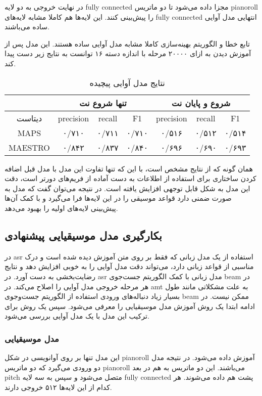 در نهایت خروجی به دو لایه \gls{fully connected} مجزا داده می‌شود تا دو ماتریس
\gls{pianoroll} را پیش‌بینی کنند. این لایه‌ها هم کاملا مشابه لایه‌های \gls{fully
connected} انتهایی مدل آوایی ساده می‌باشند.

تابع خطا و الگوریتم بهینه‌سازی کاملا مشابه مدل آوایی ساده هستند. این مدل پس از
آموزش دیدن به ازای ۲۰۰۰۰ مرحله با اندازه دسته ۱۶ توانست به نتایج زیر دست پیدا
کند.
\begin{table}[ht]
    \centering
    \begin{tabular}{|c|c|c|c|c|c|c|}
        \hline
        & \multicolumn{3}{|c|}{تنها شروع نت} & \multicolumn{3}{|c|}{شروع و پایان نت} \\
        \hline
        دیتاست & \gls{precision} & \gls{recall} & F1 & \gls{precision} & \gls{recall} & F1 \\
        \hline
        MAPS & ۰/۷۱۰ & ۰/۷۱۱ & ۰/۷۱۰ & ۰/۵۱۶ & ۰/۵۱۲ & ۰/۵۱۴ \\
        \hline
        MAESTRO & ۰/۸۴۲ & ۰/۸۳۷ & ۰/۸۴۰ & ۰/۶۹۶ & ۰/۶۹۰ & ۰/۶۹۳ \\
        \hline
    \end{tabular}
    \caption{نتایج مدل آوایی پیچیده}
\end{table}

همان گونه که از نتایج مشخص است، با این که تنها تفاوت این مدل با مدل قبل اضافه
کردن ساختاری برای استفاده از اطلاعات به دست آماده از فریم‌های دورتر است، دقت این
مدل به شکل قابل توجهی افزایش یافته است. در نتیجه می‌توان گفت که مدل به صورت ضمنی
دارد قواعد موسیقی را در این لایه‌ها فرا می‌گیرد و با کمک آن‌ها پیش‌بینی لایه‌های
اولیه را بهبود می‌دهد.

\subsection{بکارگیری مدل موسیقیایی پیشنهادی}
در \gls{asr} استفاده از یک مدل زبانی که فقط بر روی متن آموزش دیده شده است و درک
مناسبی از قواعد زبانی دارد، می‌تواند دقت مدل آوایی را به خوبی افزایش دهد و نتایج
رضایت‌بخشی به دست آورد. در \gls{asr} مدل زبانی با کمک الگوریتم جست‌جوی beam در هر
مرحله خروجی مدل آوایی را اصلاح می‌کند. در \gls{amt} به علت مشکلاتی مانند طول
بسیار زیاد دنباله‌های ورودی استفاده از الگوریتم جست‌وجوی beam ممکن نیست. در
ادامه ابتدا یک روش آموزش مدل موسیقیایی را معرفی می‌شود. سپس یک روش برای ترکیب
این مدل با یک مدل آوایی بررسی می‌شود.

\subsubsection{مدل موسیقیایی}
این مدل تنها بر روی آوانویسی در شکل \gls{pianoroll} آموزش داده می‌شود. در نتیجه
مدل دو ورودی می‌گیرد که دو ماتریس \gls{pianoroll} می‌باشند. این دو ماتریس به هم
در بعد \gls{pitch} متصل می‌شود و سپس به سه لایه \gls{fully connected} پشت هم
داده می‌شوند. هر کدام از این لایه‌ها ۵۱۲ خروجی دارند.

